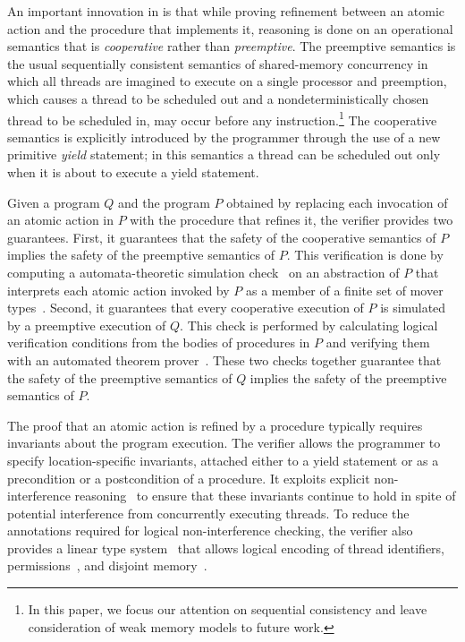 An important innovation in \civl is that while proving refinement between an atomic action and the procedure that implements it,
reasoning is done on an operational semantics that is {\em cooperative\/} rather than {\em preemptive\/}.
The preemptive semantics is the usual sequentially consistent semantics of shared-memory concurrency in which all threads are imagined
to execute on a single processor and preemption, which causes a thread to be scheduled out and a nondeterministically chosen thread to 
be scheduled in, may occur before any instruction.\footnote{In this paper, 
we focus our attention on sequential consistency and leave consideration of weak memory models to future work.}
The cooperative semantics is explicitly introduced by the programmer through the use of a new primitive {\em yield\/} statement;
in this semantics a thread can be scheduled out only when it is about to execute a yield statement.

Given a program $Q$ and the program $P$ obtained by replacing each invocation of an atomic action in $P$ 
with the procedure that refines it, the \civl verifier provides two guarantees.
First, it guarantees that the safety of the cooperative semantics of $P$ implies the safety of the preemptive semantics of $P$.
This verification is done by computing a automata-theoretic simulation check~\cite{HenzingerHK95} 
on an abstraction of $P$ that interprets each atomic action invoked by $P$ 
as a member of a finite set of mover types~\cite{Lipton75,FlanaganFLQ08}.
Second, it guarantees that every cooperative execution of $P$ is simulated by a preemptive execution of $Q$.
This check is performed by calculating logical verification conditions from the bodies of procedures in $P$ and 
verifying them with an automated theorem prover~\cite{MouraB08}.
These two checks together guarantee that the 
safety of the preemptive semantics of $Q$ implies the safety of the preemptive semantics of $P$.

The proof that an atomic action is refined by a procedure typically requires invariants about the program execution.
The \civl verifier allows the programmer to specify location-specific invariants, attached either to a yield statement
or as a precondition or a postcondition of a procedure.  
It exploits explicit non-interference reasoning~\cite{OwickiGries76} to ensure that
these invariants continue to hold in spite of potential interference from concurrently executing threads.
To reduce the annotations required for logical non-interference checking, 
the \civl verifier also provides a linear type system~\cite{Wadler90lineartypes} 
that allows logical encoding of thread identifiers, permissions~\cite{boyland:03fractions}, 
and disjoint memory~\cite{LahiriQW11}.

